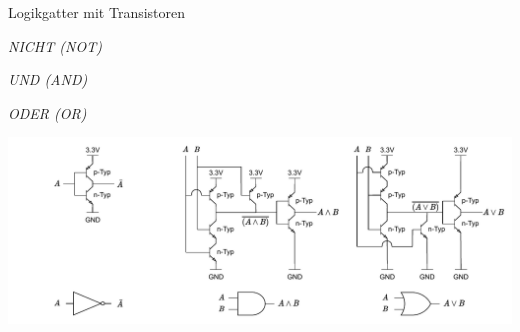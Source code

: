 \begin{defi}{Logikgatter mit Transistoren}
    \begin{minipage}[t]{0.33\textwidth}
        \begin{center}
            \emph{NICHT (NOT)}
        \end{center}
    \end{minipage}
    \begin{minipage}[t]{0.33\textwidth}
        \begin{center}
            \emph{UND (AND)}
        \end{center}
    \end{minipage}
    \begin{minipage}[t]{0.33\textwidth}
        \begin{center}
            \emph{ODER (OR)}
        \end{center}
    \end{minipage}

    \includegraphics[width=\textwidth]{includes/figures/defi_logikgatter.pdf}


\end{defi}
